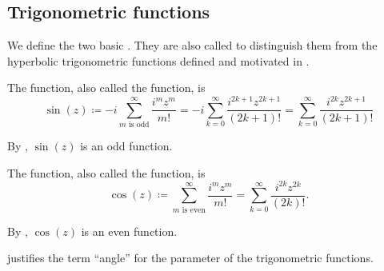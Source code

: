 \subsection{Trigonometric functions}\label{subsec:trigonometric_functions}

\begin{definition}\label{def:trigonometric_functions}
  We define the two basic . They are also called  to distinguish them from the hyperbolic trigonometric functions defined and motivated in .

  \begin{DefEnum}
     The  function, also called the  function, is
    \begin{equation*}
      \sin(z)
      \coloneqq
      -i \sum_{m \text{ is odd}}^\infty \frac {i^m z^m} {m!}
      =
      -i \sum_{k=0}^\infty \frac {i^{2k+1} z^{2k+1}} {(2k + 1)!}
      =
      \sum_{k=0}^\infty \frac {i^{2k} z^{2k+1}} {(2k + 1)!}
    \end{equation*}

    By , \( \sin(z) \) is an odd function.

     The  function, also called the  function, is
    \begin{equation*}
      \cos(z)
      \coloneqq
      \sum_{m \text{ is even}}^\infty \frac {i^m z^m} {m!}
      =
      \sum_{k=0}^\infty \frac {i^{2k} z^{2k}} {(2k)!}.
    \end{equation*}

    By , \( \cos(z) \) is an even function.
  \end{DefEnum}

   justifies the term \enquote{angle} for the parameter of the trigonometric functions.
\end{definition}

